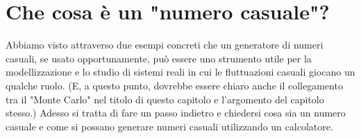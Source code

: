 \begin{snippet}[htb!]
  \bigskip %
\end{snippet}


\section{Che cosa è un "numero casuale"?}

Abbiamo visto attraverso due esempi concreti che un generatore di numeri
casuali, se usato opportunamente, può essere uno strumento utile per la
modellizzazione e lo studio di sistemi reali in cui le fluttuazioni casuali
giocano un qualche ruolo. (E, a questo punto, dovrebbe essere chiaro anche il
collegamento tra il "Monte Carlo" nel titolo di questo capitolo e l'argomento
del capitolo stesso.) Adesso si tratta di fare un passo indietro e chiedersi
cosa sia un numero casuale e come si possano generare numeri casuali utilizzando
un calcolatore.

